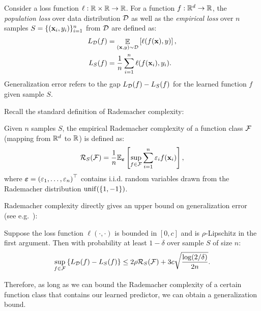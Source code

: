 

Consider a loss function $\ell: \mathbb{R} \times \mathbb{R} \to \mathbb{R}$. For a function $f: \mathbb{R}^d \to \mathbb{R}$, the \emph{population loss} over data distribution $\mathcal{D}$ as well as the \emph{empirical loss} over $n$ samples $S = \{(\mathbf{x}_i, y_i)\}_{i=1}^n$ from $\mathcal{D}$ are defined as:
\begin{equation*}
\begin{aligned}
L_{\mathcal{D}}(f) &= \mathop\mathbb{E}_{(\mathbf{x}, y)\sim\mathcal{D}}\left[ \ell(f(\mathbf{x}), y) \right],\\
L_S(f) &= \frac{1}{n}\sum_{i=1}^{n}\ell(f(\mathbf{x}_i),y_i).
\end{aligned}
\end{equation*}
Generalization error refers to the gap $L_{\mathcal{D}}(f) - L_S(f)$ for the learned function $f$ given sample $S$.

Recall the standard definition of Rademacher complexity:
\begin{defn}\label{defn:rademacher}
Given $n$ samples $S$, the empirical Rademacher complexity of a function class $\mathcal{F}$ (mapping from $\mathbb{R}^d$ to $\mathbb{R}$) is defined as:
\[
\mathcal{R}_S(\mathcal{F}) = \frac{1}{n} \mathbb{E}_{\bm {\varepsilon}}\left[\sup_{f \in \mathcal{F}}\sum_{i=1}^{n} \varepsilon_i f(\mathbf{x}_i)\right],
\]
where $\bm{\varepsilon} = \left(\varepsilon_1,\ldots,\varepsilon_n\right)^\top $ contains i.i.d. random variables drawn from the Rademacher distribution $\mathrm{unif}(\{1, -1\})$.
\end{defn}

Rademacher complexity directly gives an upper bound on generalization error (see e.g.~\citep{mohri2012foundations}):%
\begin{thm}\label{thm:rad_generalization}
Suppose the loss function $\ell(\cdot,\cdot)$ is bounded in $[0, c]$ and is $\rho$-Lipschitz in the first argument. Then with probability at least $1-\delta$ over sample $S$ of size $n$:
\[
\sup_{f \in \mathcal{F}} \left\{ L_{\mathcal{D}}(f)-L_{S}(f) \right\} \le 2\rho \mathcal{R}_S(\mathcal{F}) + 3c \sqrt{\frac{\log(2/\delta)}{2n}}.
\]
\end{thm}
Therefore, as long as we can bound the Rademacher complexity of a certain function class that contains our learned predictor, we can obtain a generalization bound.
